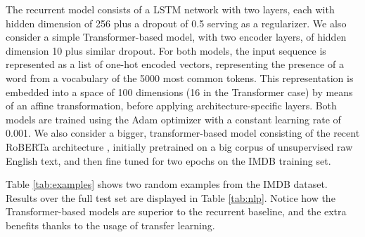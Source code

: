 The recurrent model consists of a LSTM network with two layers, each with hidden dimension of 256 plus a dropout of 0.5 serving as a regularizer. We also consider a simple Transformer-based model, with two encoder layers, of hidden dimension 10 plus similar dropout. For both models, the input sequence is represented as a list of one-hot encoded vectors, representing the presence of a word from a vocabulary of the 5000 most common tokens. This representation is embedded into a space of 100 dimensions
(16 in the Transformer case) by means of an affine transformation, before applying architecture-specific layers. Both models are trained using the Adam optimizer with a constant learning rate of 0.001.
We also consider a bigger, transformer-based model consisting of the recent RoBERTa architecture \parencite{liu2019roberta}, 
initially pretrained on a big corpus of unsupervised raw  English text, and then fine tuned for two epochs on the IMDB training set. %

Table \ref{tab:examples} shows two random examples from the IMDB dataset.
Results over the full test set are displayed in Table \ref{tab:nlp}. Notice how the Transformer-based models are superior to the recurrent baseline, and the extra benefits thanks to the usage of transfer learning.

